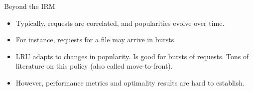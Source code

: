 \documentclass[aspectratio=169]{beamer}
\newenvironment*{myitem}[1][1.5em]{\begin{itemize}\setlength{\itemsep}{#1}}{\end{itemize}}
\begin{document}
\begin{frame}{Beyond the IRM}

  \begin{myitem}[2em]

    \item Typically, requests are correlated, and popularities evolve over time.
    
    \item For instance, requests for a file may arrive in bursts.

    \item \alert{LRU} adapts to changes in popularity. Is good for bursts of requests. Tons of literature on this policy (also called move-to-front).

    \item However, performance metrics and optimality results are \alert{hard} to establish. 
  \end{myitem}
  
\end{frame}
\end{document}
